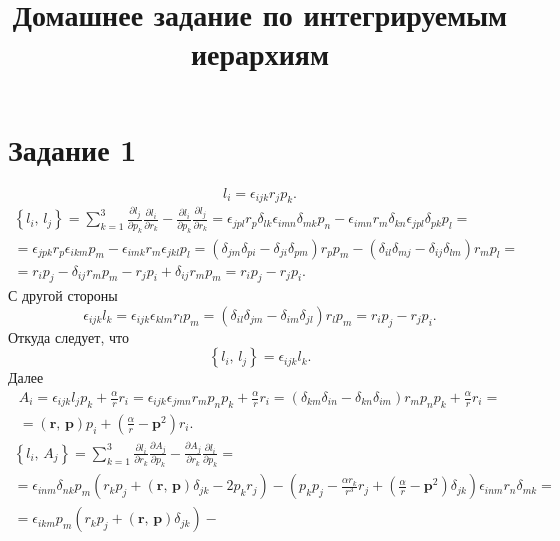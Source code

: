 \documentclass[a4paper]{article}
\title{Домашнее задание по интегрируемым иерархиям}
\begin{document}
	\maketitle
\section*{Задание 1}
\begin{hiProb}[Упражнение 1.0]
\end{hiProb}
\begin{sol}
\[
l_i=\epsilon _{ijk} r_j p_k
.\] 
\begin{multline*}
\left\{ l_i,\,l_j \right\} =\sum_{k=1}^{3} 
\frac{\partial l_j}{\partial p_k} 
\frac{\partial l_i}{\partial r_k} -\frac{\partial l_i}{\partial p_k} \frac{\partial l_j}{\partial r_k}=
\epsilon _{jpl}r_p \delta_{lk}
\epsilon _{imn}\delta_{m k}p_n -\epsilon _{imn}r_m \delta_{kn}
\epsilon _{jpl}\delta_{pk}p_l =\\=
\epsilon _{jpk}r_p \epsilon _{ikm}p_m-\epsilon _{imk} r_m \epsilon _{jkl}p_l
=
(\delta_{jm}\delta_{pi}-\delta_{ji}\delta_{pm})r_pp_m-(\delta_{il}\delta_{mj}-\delta_{ij}\delta_{lm})r_mp_l
=
\\=r_ip_j-\delta_{ij}r_mp_m-r_jp_i+\delta_{ij}r_mp_m =
r_i p_j-r_j p_i
.\end{multline*} 
С другой стороны
\[
\epsilon _{ijk}l_k =\epsilon _{ijk}\epsilon _{klm}r_l p_m=
(\delta_{il}\delta_{jm}-\delta_{im}\delta_{jl})r_l p_m=
r_i p_j-r_jp_i
.\] 
Откуда следует, что
\[
\left\{ l_i,\,l_j \right\} =\epsilon _{ijk}l_k
.\] 
Далее
\begin{multline*}
A_i= \epsilon _{ijk} l_j p_k + \frac{\alpha}{r}r_i=
\epsilon _{ijk} \epsilon _{jmn}r_m p_n p_k +\frac{\alpha}{r}
r_i=
(\delta_{km}\delta_{in}-\delta_{kn}\delta_{im})
r_m p_n p_k+ \frac{\alpha}{r}r_i=
\\=(\mathbf{r},\,\mathbf{p})p_i+\left(\frac{\alpha}{r}-\mathbf{p}^2\right)r_i
.\end{multline*} 
\begin{multline*}
\left\{ l_i,\,A_j \right\} =
\sum_{k=1}^{3} \frac{\partial l_i}{\partial r_k} 
\frac{\partial A_j}{\partial p_k}-
\frac{\partial A_j}{\partial r_k} \frac{\partial l_i}{\partial p_k} =\\=
\epsilon _{inm}\delta_{nk} p_m
\left(r_k p_j+(\mathbf{r},\,\mathbf{p})\delta_{jk}-2p_k r_j\right)-
\left(p_kp_j - \frac{\alpha r_k}{r^3}r_j+\left(\frac{\alpha}{r}-\mathbf{p}^2\right) \delta_{jk} \right) 
\epsilon_{inm}r_n \delta_{m k }=\\
=\epsilon _{ikm} p_m
\left(r_k p_j+(\mathbf{r},\,\mathbf{p})\delta_{jk}\right)-

\end{multline*}
\end{sol}
\end{document}
